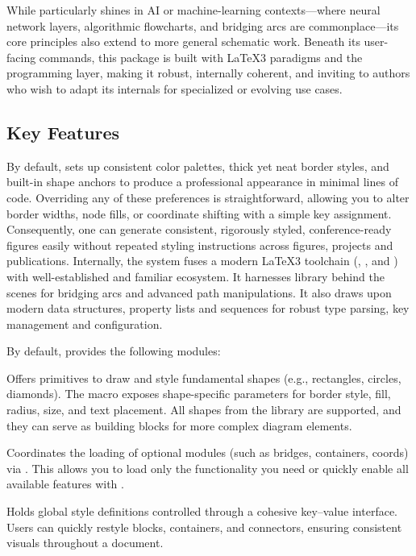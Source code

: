 \documentclass[show-experimental]{l3doc}
\begin{document}
While  particularly shines in AI or machine-learning contexts—where neural network layers, algorithmic flowcharts, and bridging arcs are commonplace—its core principles also extend to more general schematic work. Beneath its user-facing commands, this package is built with \LaTeX3 paradigms and the  programming layer, making it robust, internally coherent, and inviting to authors who wish to adapt its internals for specialized or evolving use cases.


\subsection{Key Features}

By default,  sets up consistent color palettes, thick yet neat border styles, and built-in shape anchors to produce a professional appearance in minimal lines of code. Overriding any of these preferences is straightforward, allowing you to alter border widths, node fills, or coordinate shifting with a simple key assignment. Consequently, one can generate consistent, rigorously styled, conference-ready figures easily without repeated styling instructions across figures, projects and publications. Internally, the system fuses a modern \LaTeX3 toolchain (, , and ) with well-established and familiar  ecosystem. It harnesses  library behind the scenes for bridging arcs and advanced path manipulations. It also draws upon  modern data structures, property lists and sequences for robust type parsing, key management and configuration.

\noindent By default,  provides the following modules:

 Offers primitives to draw and style fundamental shapes (e.g., rectangles, circles, diamonds). The  macro exposes shape-specific parameters for border style, fill, radius, size, and text placement. All shapes from the   library are supported, and they can serve as building blocks for more complex diagram elements.

 Coordinates the loading of optional modules (such as bridges, containers, coords) via . This allows you to load only the functionality you need or quickly enable all available features with \Arg{*}.

 Holds global style definitions controlled through a cohesive key–value interface. Users can quickly restyle blocks, containers, and connectors, ensuring consistent visuals throughout a document.
\end{document}
